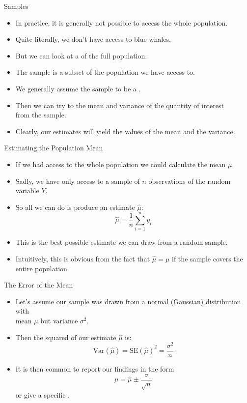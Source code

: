 \documentclass[mathserif, aspectratio=169]{beamer}
\begin{document}
\begin{frame}{Samples}
	\begin{itemize}
		\item In practice, it is generally not possible to access the whole population.
		\item Quite literally, we don't have access to  blue whales.
		\item But we can look at a  of the full population.
		\item The sample is a subset of the population we have access to.
		\item We generally assume the sample to be a .
		\item Then we can try to  the mean and variance of the quantity of interest\\
			from the sample.
		\item Clearly, our estimates will  yield the  values of the mean and the variance.
	\end{itemize}
\end{frame}

\begin{frame}{Estimating the Population Mean}
	\begin{itemize}
		\item If we had access to the whole population we could calculate the  mean $\mu$.
		\item Sadly, we have only access to a sample of $n$ observations of the random variable $Y$.
		\item So all we can do is produce an estimate $\hat{\mu}$:
			\[ \hat{\mu} = \frac{1}{n}\sum_{i=1}^n y_i \]
		\item This is the best possible  estimate we can draw from a random sample.
		\item Intuitively, this is obvious from the fact that $\hat{\mu} = \mu$ if the sample covers
			the entire population.
	\end{itemize}
\end{frame}

\begin{frame}{The Error of the Mean}
	\begin{itemize}
		\item Let's assume our sample was drawn from a normal (Gaussian) distribution with\\
			 mean $\mu$ but  variance $\sigma^2$.
		\item Then the squared  of our estimate $\hat{\mu}$ is:
			\[ \text{Var}(\hat{\mu}) = \text{SE}(\hat{\mu})^2 = \frac{\sigma^2}{n} \]
		\item It is then common to report our findings in the form 
			\[ \mu = \hat{\mu} \pm \frac{\sigma}{\sqrt{n}} \]
			or give a specific .
	\end{itemize}
\end{frame}
\end{document}
